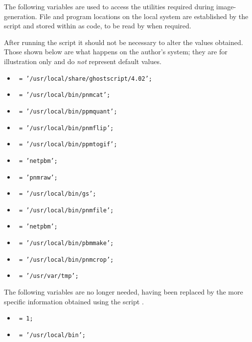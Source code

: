 \begin{changebar}%
\noindent
The following variables are used to access the utilities required during image-generation. 
File and program locations on the local system are established by the  
\Perl{} script and stored within  as \Perl{} code, 
to be read by  when required.

After running the  \Perl{} script it should not be necessary 
to alter the values obtained. Those shown below are what happens on the author's system;
they are for illustration only and do \emph{not} represent default values.
%
\begin{itemize}\label{graphicsutils}%
\item  {}\texttt{ = '/usr/local/share/ghostscript/4.02';}
\item  {}\texttt{ = '/usr/local/bin/pnmcat';}
\item  {}\texttt{ = '/usr/local/bin/ppmquant';}
\item  {}\texttt{ = '/usr/local/bin/pnmflip';}
\item  {}\texttt{ = '/usr/local/bin/ppmtogif';}
\item  {}\texttt{ = 'netpbm';}
\item  {}\texttt{ = 'pnmraw';}
\item  {}\texttt{ = '/usr/local/bin/gs';}
\item  {}\texttt{ = '/usr/local/bin/pnmfile';}
\item  {}\texttt{ = 'netpbm';}
\item  {}\texttt{ = '/usr/local/bin/pbmmake';}
\item  {}\texttt{ = '/usr/local/bin/pnmcrop';}
\item  {}\texttt{ = '/usr/var/tmp';}
\end{itemize}

\noindent
The following variables are no longer needed, having been replaced by the
more specific information obtained using the \Perl{} script .
\begin{itemize}
\item [] \texttt{ = 1;}
\item [] \texttt{ = '/usr/local/bin';}
\end{itemize}\end{changebar}%


